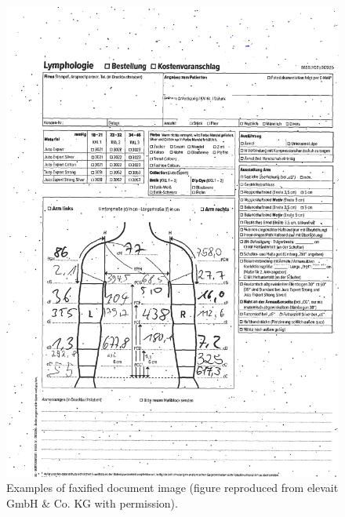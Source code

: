 \begin{figure}[H]
        \vspace*{1cm}
        \begin{center}
	    \includegraphics[scale=0.32]{images/Appendix/FaxifiedImage.png}
	    \caption[Examples of faxified document image.]{Examples of faxified document image (figure reproduced from elevait GmbH \& Co. KG with permission).}
	    \label{fig:FaxifiedImage}
	    \end{center}
\end{figure}




